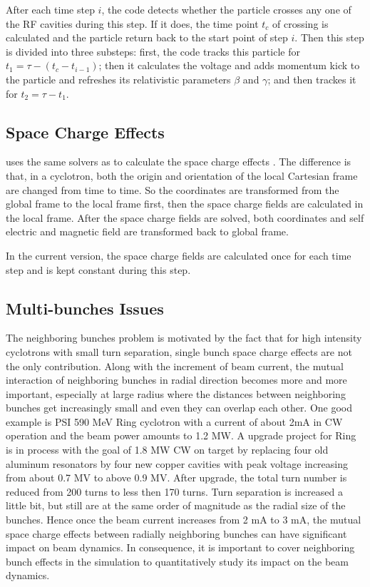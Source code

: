 After each time step $i$, the code detects whether the particle crosses any one of the RF cavities during this step.
If it does, the time point $t_c$ of crossing is calculated and the particle return back to the start point of
step $i$. Then this step is divided into three substeps:
first, the code tracks this particle for $ t_1 = \tau - (t_c-t_{i-1})$;
then it calculates the voltage and adds momentum kick to the particle and refreshes its relativistic parameters $\beta$ and $\gamma$;
and then trackes it for $t_2 = \tau - t_1$.

\subsection{Space Charge Effects}

\opalcycl uses the same solvers as \opalt to calculate the space charge effects .
The difference is that, in a cyclotron,
both the origin and orientation of the local Cartesian frame are changed from time to time. So the coordinates are transformed from
the global frame to the local frame first, then the space charge fields are calculated in the local frame.
After the space charge fields are solved, both coordinates and self electric and magnetic field are transformed back to global frame.

In the current version, the space charge fields are calculated once for each time step and is kept constant during this step.

\subsection{Multi-bunches Issues}
\label{sec:opalcycl:MultiBunch}

The neighboring bunches problem is motivated by the fact that for high intensity cyclotrons with small turn
separation, single bunch space charge effects are not the only contribution. Along with the increment of beam
current, the mutual interaction of neighboring bunches in radial direction becomes more and more important,
especially at large radius where the distances between neighboring bunches get increasingly small and even they
can overlap each other. One good example is PSI 590 MeV Ring cyclotron with a current of about 2mA in
CW operation and the beam power amounts to 1.2 MW. A upgrade project for Ring is in process with
the goal of 1.8 MW CW on target by replacing four old aluminum resonators by four new copper cavities with peak
voltage increasing from about 0.7 MV to above 0.9 MV. After upgrade, the total turn
number is reduced from 200 turns to less then 170 turns.
Turn separation is increased a little bit, but still are at the same order
of magnitude as the radial size of the bunches. Hence once the beam current increases from 2 mA to 3 mA, the mutual space
charge effects between radially neighboring bunches can have significant impact on beam dynamics.
In consequence, it is important to cover neighboring bunch effects in the simulation to quantitatively study its impact on the beam dynamics.

